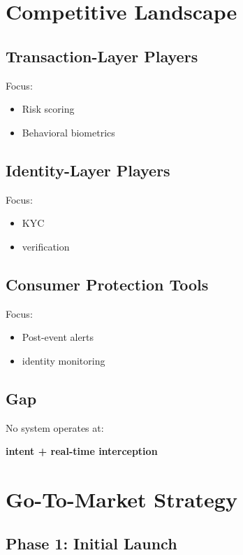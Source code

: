 \documentclass[11pt]{article}
\begin{document}
\section{Competitive Landscape}

\subsection{Transaction-Layer Players}

Focus:
\begin{itemize}
    \item Risk scoring
    \item Behavioral biometrics
\end{itemize}

\subsection{Identity-Layer Players}

Focus:
\begin{itemize}
    \item KYC
    \item verification
\end{itemize}

\subsection{Consumer Protection Tools}

Focus:
\begin{itemize}
    \item Post-event alerts
    \item identity monitoring
\end{itemize}

\subsection{Gap}

No system operates at:
\begin{center}
\textbf{intent + real-time interception}
\end{center}

\section{Go-To-Market Strategy}

\subsection{Phase 1: Initial Launch}
\end{document}
